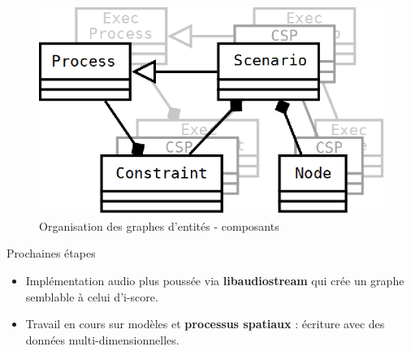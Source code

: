 \begin{block}{}
    \vspace{-3cm}
    \begin{figure}\centering
        \includegraphics[width=0.7\columnwidth]{images/orga3.eps}
        \caption{Organisation des graphes d'entités - composants}
        \label{fig.uml}
    \end{figure}
\end{block}
\begin{block}{Prochaines étapes}
    \small
    \begin{itemize}
        \item Implémentation audio plus poussée via \textbf{libaudiostream}\cite{letz_specification_2014} qui crée un graphe semblable à celui d'i-score.
        \item Travail en cours sur modèles et \textbf{processus spatiaux} : écriture avec des données multi-dimensionnelles.
    \end{itemize}
\end{block}